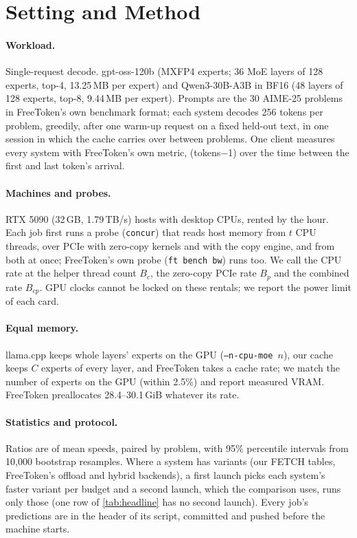 \documentclass[10pt,twocolumn]{article}
\begin{document}
\section{Setting and Method}\label{sec:setting}
\paragraph{Workload.} Single-request decode. gpt-oss-120b (MXFP4 experts; 36 MoE layers of 128 experts, top-4,
13.25\,MB per expert) and Qwen3-30B-A3B in BF16 (48 layers of 128 experts, top-8, 9.44\,MB per expert). Prompts are
the 30 AIME-25 problems in FreeToken's own benchmark format; each system decodes 256 tokens per problem, greedily,
after one warm-up request on a fixed held-out text, in one session in which the cache carries over between problems.
One client measures every system with FreeToken's own metric, (tokens$-$1) over the time between the first and last
token's arrival.

\paragraph{Machines and probes.} RTX 5090 (32\,GB, 1.79\,TB/s) hosts with desktop CPUs, rented by the hour. Each job
first runs a probe (\texttt{concur}) that reads host memory from $t$ CPU threads, over PCIe with zero-copy kernels and
with the copy engine, and from both at once; FreeToken's own probe (\texttt{ft bench bw}) runs too. We call the CPU
rate at the helper thread count $B_c$, the zero-copy PCIe rate $B_p$ and the combined rate $B_{cp}$. GPU clocks cannot
be locked on these rentals; we report the power limit of each card.

\paragraph{Equal memory.} llama.cpp keeps whole layers' experts on the GPU (\texttt{--n-cpu-moe}~$n$), our cache keeps
$C$ experts of every layer, and FreeToken takes a cache rate; we match the number of experts on the GPU (within
2.5\%) and report measured VRAM. FreeToken preallocates 28.4--30.1\,GiB whatever its rate.

\paragraph{Statistics and protocol.} Ratios are of mean speeds, paired by problem, with 95\% percentile intervals from
10{,}000 bootstrap resamples. Where a system has variants (our FETCH tables, FreeToken's offload and hybrid backends),
a first launch picks each system's faster variant per budget and a second launch, which the comparison uses, runs only
those (one row of \cref{tab:headline} has no second launch). Every job's predictions are in the header of its script, committed and pushed before the machine starts.
\end{document}
